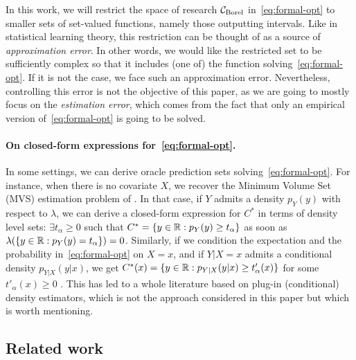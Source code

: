 In this work, we will restrict the space of research ${\cal C}_{\text{Borel}}$ in~\eqref{eq:formal-opt} to smaller sets of set-valued functions, namely those outputting intervals. Like in statistical learning theory, this restriction can be thought of as a source of \emph{approximation error}. In other words, we would like the restricted set to be sufficiently complex so that it includes (one of) the function solving~\eqref{eq:formal-opt}. If it is not the case, we face such an approximation error. Nevertheless, controlling this error is not the objective of this paper, as we are going to mostly focus on the \emph{estimation error}, which comes from the fact that only an empirical version of~\eqref{eq:formal-opt} is going to be solved.%


\paragraph{On closed-form expressions for~\eqref{eq:formal-opt}.} In some settings, we can derive oracle prediction sets solving~\eqref{eq:formal-opt}. For instance, when there is no covariate $X$, we recover the Minimum Volume Set (MVS) estimation problem of \citet{NIPS2005_d3d80b65}. In that case, if $Y$ admits a density $p_Y(y)$ with respect to $\lambda$, we can derive a closed-form expression for $C^*$ in terms of density level sets: $\exists t_\alpha\geq 0$ such that $C^*=\{y\in{\mathbb{R}} : p_Y(y) \geq t_\alpha\}$ as soon as $\lambda(\{y\in{\mathbb{R}} : p_Y(y) = t_\alpha\})=0$. Similarly, if we condition the expectation and the probability in~\eqref{eq:formal-opt} on $X=x$, and if $Y|X=x$ admits a conditional density $p_{Y|X}(y|x)$, we get $C^*(x)=\{y\in{\mathbb{R}} : p_{Y|X}(y|x) \geq t'_\alpha(x)\}$ for some $t'_\alpha(x)\geq 0$ \citep{polonik2000conditional,lei2014distribution}. This has led to a whole literature based on plug-in (conditional) density estimators, which is not the approach considered in this paper but which is worth mentioning.



\subsection{Related work}


